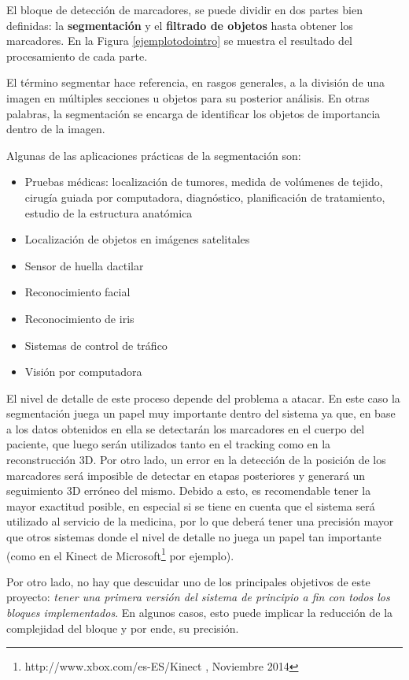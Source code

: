 El bloque de detección de marcadores, se puede dividir en dos partes bien definidas: la \textbf{segmentación} y el \textbf{filtrado de objetos} hasta obtener los marcadores. En la Figura \ref{ejemplotodointro} se muestra el resultado del procesamiento de cada parte.

El término segmentar hace referencia, en rasgos generales, a la división de una imagen en múltiples secciones u objetos para su posterior análisis. En otras palabras, la segmentación se encarga de identificar los objetos de importancia dentro de la imagen. 

Algunas de las aplicaciones prácticas de la segmentación son:
\begin{itemize}
\item Pruebas médicas: localización de tumores, medida de volúmenes de tejido, cirugía guiada por computadora, diagnóstico, planificación de tratamiento, estudio de la estructura anatómica
\item Localización de objetos en imágenes satelitales
\item Sensor de  huella dactilar
\item Reconocimiento facial
\item Reconocimiento de iris
\item Sistemas de control de tráfico
\item Visión por computadora
\end{itemize}

El nivel de detalle de este proceso depende del problema a atacar. En este caso la segmentación juega un papel muy importante dentro del sistema ya que, en base a los datos obtenidos en ella se detectarán los marcadores en el cuerpo del paciente, que luego serán utilizados tanto en el tracking como en la reconstrucción 3D. Por otro lado, un error en la detección de la posición de los marcadores será imposible de detectar en etapas posteriores y generará un seguimiento 3D erróneo del mismo. Debido a esto, es recomendable tener la mayor exactitud posible, en especial si se tiene en cuenta que el sistema será utilizado al servicio de la medicina, por lo que deberá tener una precisión mayor que otros sistemas donde el nivel de detalle no juega un papel tan importante (como en el Kinect de Microsoft\footnote{http://www.xbox.com/es-ES/Kinect , Noviembre 2014} por ejemplo).

Por otro lado, no hay que descuidar uno de los principales objetivos de este proyecto: \emph{tener una primera versión del sistema de principio a fin con todos los bloques implementados}. En algunos casos, esto puede implicar la reducción de la complejidad del bloque y por ende, su precisión.

